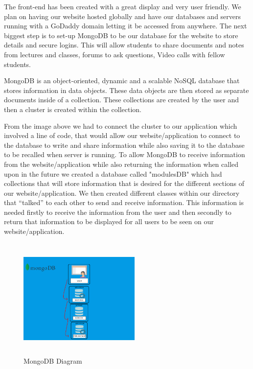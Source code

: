 The front-end has been created with a great display and very user friendly. We plan on having our website hosted globally and have our databases and servers running with a GoDaddy\cite{ref21} domain letting it be accessed from anywhere. The next biggest step is to set-up MongoDB to be our database for the website to store details and secure logins. This will allow students to share documents and notes from lectures and classes, forums to ask questions, Video calls with fellow students. \hfill \break  

MongoDB is an object-oriented, dynamic and a scalable NoSQL database that stores information in data objects. These data objects are then stored as separate documents inside of a collection. These collections are created by the user and then a cluster is created within the collection. \hfill \break


From the image above we had to connect the cluster to our application which involved a line of code, that would allow our website/application to connect to the database to write and share information while also saving it to the database to be recalled when server is running. To allow MongoDB to receive information from the website/application while also returning the information when called upon in the future we created a database called "modulesDB" which had collections that will store information that is desired for the different sections of our website/application. We then created different classes within our directory that “talked” to each other to send and receive information. This information is needed firstly to receive the information from the user and then secondly to return that information to be displayed for all users to be seen on our website/application.   


\begin{figure}
    \centering
    \includegraphics[width=6cm,height = 6cm]{images/28.png}
    \caption{ MongoDB Diagram}
    \label{fig:my_label}
\end{figure}


